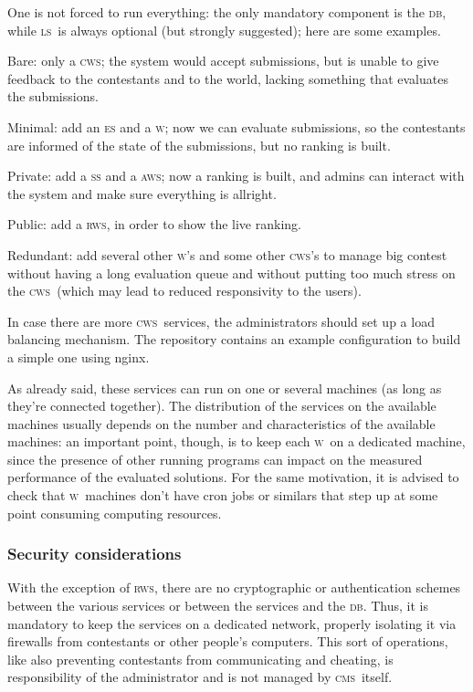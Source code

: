 \documentclass[a4paper,8pt]{amsart}
\newcommand{\CMS}{\textsc{cms}}
\newcommand{\DB}{\textsc{db}}
\newcommand{\LS}{\textsc{ls}}
\newcommand{\ES}{\textsc{es}}
\newcommand{\WS}{\textsc{w}}
\renewcommand{\SS}{\textsc{ss}}
\newcommand{\CWS}{\textsc{cws}}
\newcommand{\AWS}{\textsc{aws}}
\newcommand{\RWS}{\textsc{rws}}
\newenvironment{squishlist}{%
  \begin{list}{\textbullet}%
    { \setlength{\itemsep}{0pt}%
      \setlength{\parsep}{3pt}%
      \setlength{\topsep}{3pt}%
      \setlength{\partopsep}{0pt}%
      \setlength{\leftmargin}{1.5em}%
      \setlength{\labelwidth}{1em}%
      \setlength{\labelsep}{0.5em} }%
}{\end{list}}
\begin{document}
\begin{multicols}{2}
  One is not forced to run everything: the only mandatory component is
  the \DB, while \LS\ is always optional (but strongly suggested);
  here are some examples.
  \begin{squishlist}
  \item Bare: only a \CWS{}; the system would accept submissions, but
    is unable to give feedback to the contestants and to the world,
    lacking something that evaluates the submissions.
  \item Minimal: add an \ES{} and a \WS{}; now we can evaluate
    submissions, so the contestants are informed of the state of the
    submissions, but no ranking is built.
  \item Private: add a \SS{} and a \AWS{}; now a ranking is built, and
    admins can interact with the system and make sure everything is
    allright.
  \item Public: add a \RWS{}, in order to show the live ranking.
  \item Redundant: add several other \WS{}'s and some other \CWS{}'s
    to manage big contest without having a long evaluation queue and
    without putting too much stress on the \CWS\ (which may lead to
    reduced responsivity to the users).
  \end{squishlist}

  In case there are more \CWS\ services, the administrators should set
  up a load balancing mechanism. The repository contains an example
  configuration to build a simple one using nginx.

  As already said, these services can run on one or several machines
  (as long as they're connected together). The distribution of the
  services on the available machines usually depends on the number and
  characteristics of the available machines: an important point,
  though, is to keep each \WS\ on a dedicated machine, since the
  presence of other running programs can impact on the measured
  performance of the evaluated solutions. For the same motivation, it
  is advised to check that \WS\ machines don't have cron jobs or
  similars that step up at some point consuming computing resources.

  \subsubsection{Security considerations}

  With the exception of \RWS, there are no cryptographic or
  authentication schemes between the various services or between the
  services and the \DB. Thus, it is mandatory to keep the services on
  a dedicated network, properly isolating it via firewalls from
  contestants or other people's computers. This sort of operations,
  like also preventing contestants from communicating and cheating, is
  responsibility of the administrator and is not managed by
  \CMS\ itself.


\end{multicols}
\end{document}
